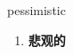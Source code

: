 
\begin{frame}
{\huge pessimistic}
\begin{center}
\begin{enumerate}\Large
  \item \textbf{悲观的}
\end{enumerate}
\end{center}
\end{frame}
